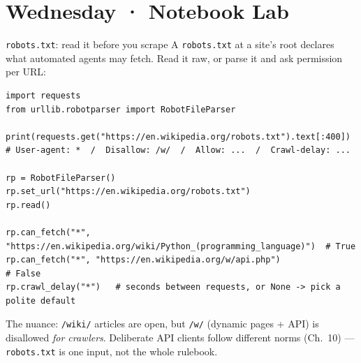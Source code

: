\documentclass[9pt,aspectratio=169]{beamer}
\begin{document}
\section{Wednesday · Notebook Lab}

\begin{frame}[fragile]{\texttt{robots.txt}: read it before you scrape}
    A \texttt{robots.txt} at a site's root declares what automated agents may fetch. Read it raw, or parse it and ask permission per URL:
\begin{lstlisting}
import requests
from urllib.robotparser import RobotFileParser

print(requests.get("https://en.wikipedia.org/robots.txt").text[:400])
# User-agent: *  /  Disallow: /w/  /  Allow: ...  /  Crawl-delay: ...

rp = RobotFileParser()
rp.set_url("https://en.wikipedia.org/robots.txt")
rp.read()

rp.can_fetch("*", "https://en.wikipedia.org/wiki/Python_(programming_language)")  # True
rp.can_fetch("*", "https://en.wikipedia.org/w/api.php")                           # False
rp.crawl_delay("*")   # seconds between requests, or None -> pick a polite default
\end{lstlisting}
    The nuance: \texttt{/wiki/} articles are open, but \texttt{/w/} (dynamic pages + API) is disallowed \textit{for crawlers}. Deliberate API clients follow different norms (Ch.~10) --- \texttt{robots.txt} is one input, not the whole rulebook.
\end{frame}
\end{document}
